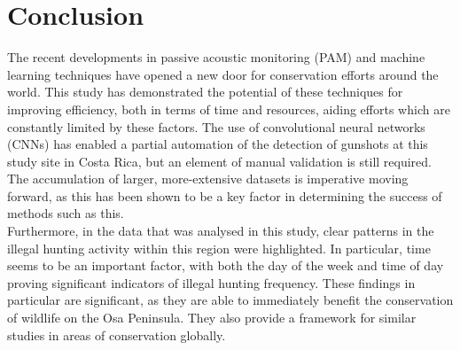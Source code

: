 
\chapter{Conclusion} %

\label{Conclusion} %

The recent developments in passive acoustic monitoring (PAM) and machine learning techniques have opened a new door for conservation efforts around the world. This study has demonstrated the potential of these techniques for improving efficiency, both in terms of time and resources, aiding efforts which are constantly limited by these factors. The use of convolutional neural networks (CNNs) has enabled a partial automation of the detection of gunshots at this study site in Costa Rica, but an element of manual validation is still required. The accumulation of larger, more-extensive datasets is imperative moving forward, as this has been shown to be a key factor in determining the success of methods such as this.\\

\noindent Furthermore, in the data that was analysed in this study, clear patterns in the illegal hunting activity within this region were highlighted. In particular, time seems to be an important factor, with both the day of the week and time of day proving significant indicators of illegal hunting frequency. These findings in particular are significant, as they are able to immediately benefit the conservation of wildlife on the Osa Peninsula. They also provide a framework for similar studies in areas of conservation globally.
